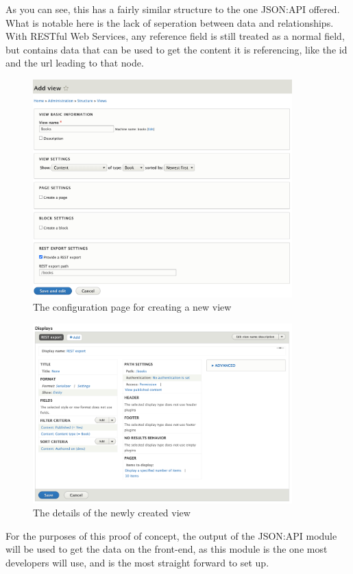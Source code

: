 As you can see, this has a fairly similar structure to the one JSON:API offered. What is notable here is the lack of seperation between data and relationships. With RESTful Web Services, any reference field is still treated as a normal field, but contains data that can be used to get the content it is referencing, like the id and the url leading to that node.

\begin{figure}[h]
	\centering
	\includegraphics[width=10cm]{./img/View_Create.png}
	\caption[Creating a View]{The configuration page for creating a new view}
\end{figure}

\begin{figure}[h]
	\centering
	\includegraphics[width=10cm]{./img/View_Details.png}
	\caption[Details of a View]{The details of the newly created view}
\end{figure}

For the purposes of this proof of concept, the output of the JSON:API module will be used to get the data on the front-end, as this module is the one most developers will use, and is the most straight forward to set up.

